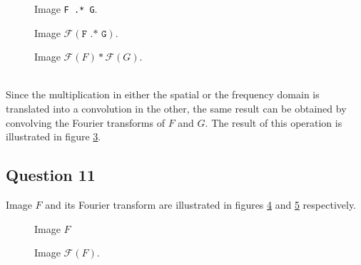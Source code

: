 \begin{minipage}{\linewidth}
  \centering
  \begin{minipage}{0.25\linewidth}
    \begin{figure}[H]
      \scalebox{0.4}{}
      \caption{Image \texttt{F .* G}.}
      \label{fig:Q10_1}
    \end{figure}
  \end{minipage}
  \hspace{0.05\linewidth}
  \begin{minipage}{0.25\linewidth}
    \begin{figure}[H]
      \scalebox{0.4}{}
      \caption{Image $\mathcal{F}(\texttt{F .* G})$.}
      \label{fig:Q10_2}
    \end{figure}
  \end{minipage}
    \hspace{0.05\linewidth}
  \begin{minipage}{0.25\linewidth}
    \begin{figure}[H]
      \scalebox{0.4}{}
      \caption{Image $\mathcal{F}(F) * \mathcal{F}(G)$.}
      \label{fig:Q10_3}
    \end{figure}
  \end{minipage}
\end{minipage}
\\

Since the multiplication in either the spatial or the frequency domain is translated into a convolution in the other, 
the same result can be obtained by convolving the Fourier transforms of $F$ and $G$. The result of this operation is
illustrated in figure \ref{fig:Q10_3}.


\subsection{Question 11}

Image $F$ and its Fourier transform are illustrated in figures \ref{fig:Q11_1} and \ref{fig:Q11_2} respectively.

\begin{minipage}{\linewidth}
  \centering
  \begin{minipage}{0.4\linewidth}
    \begin{figure}[H]
      \scalebox{0.6}{}
      \caption{Image $F$}
      \label{fig:Q11_1}
    \end{figure}
  \end{minipage}
  \hspace{0.05\linewidth}
  \begin{minipage}{0.4\linewidth}
    \begin{figure}[H]
      \scalebox{0.6}{}
      \caption{Image $\mathcal{F}(F)$.}
      \label{fig:Q11_2}
    \end{figure}
  \end{minipage}
\end{minipage}
\\

